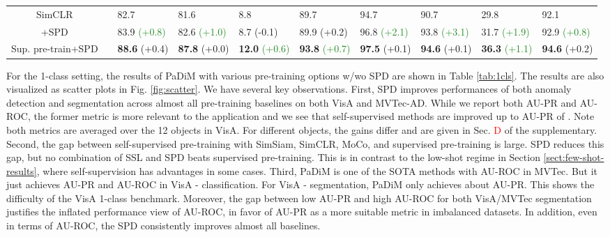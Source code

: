 \documentclass[runningheads]{llncs}
\newcommand{\cmark}{\ding{51}}\newcommand{\xmark}{\ding{55}}\usepackage[colorlinks]{hyperref}
\begin{document}
\begin{table*}[!t]
{\begin{tabular}{c|c|llll||llll}
    SimCLR               & \xmark & 82.7 & \multicolumn{1}{l|}{81.6}  & 8.8  & 89.7   & 94.7 & \multicolumn{1}{l|}{90.7}  & 29.8 & 92.1  \\
    +SPD                 & \xmark & 83.9 \textcolor{forestgreen}{(+0.8)} & \multicolumn{1}{l|}{82.6 \textcolor{forestgreen}{(+1.0)}}  & 8.7 (-0.1) & 89.9 (+0.2) & 96.8 \textcolor{forestgreen}{(+2.1)} & \multicolumn{1}{l|}{93.8 \textcolor{forestgreen}{(+3.1)}}  & 31.7 \textcolor{forestgreen}{(+1.9)} & 92.9 \textcolor{forestgreen}{(+0.8)} \\ \hline
    Sup. pre-train+SPD & \cmark & \textbf{88.6} (+0.4) & \multicolumn{1}{l|}{\textbf{87.8} (+0.0)}  & \textbf{12.0} \textcolor{forestgreen}{(+0.6)} & \textbf{93.8} \textcolor{forestgreen}{(+0.7)}  & \textbf{97.5} (+0.1) & \multicolumn{1}{l|}{\textbf{94.6} (+0.1)}  & \textbf{36.3} \textcolor{forestgreen}{(+1.1)} & \textbf{94.6} (+0.2) \\ \hline 
    \end{tabular}
	}
\end{table*}

For the 1-class setting, the results of PaDiM with various pre-training options w/wo SPD are shown in Table \ref{tab:1cls}. The results are also visualized as scatter plots in Fig. \ref{fig:scatter}. We have several key observations. First, SPD improves performances of both anomaly detection and segmentation across almost all pre-training baselines on both VisA and MVTec-AD. While we report both AU-PR and AU-ROC, the former metric is more relevant to the application and we see that self-supervised methods are improved up to AU-PR of . Note both metrics are averaged over the 12 objects in VisA. For different objects, the gains differ and are given in Sec. \textcolor{red}{D} of the supplementary. Second, the gap between self-supervised pre-training with SimSiam, SimCLR, MoCo, and supervised pre-training is large. SPD reduces this gap, but no combination of SSL and SPD beats supervised pre-training. This is in contrast to the low-shot regime in Section \ref{sect:few-shot-results}, where self-supervision has advantages in some cases. Third, PaDiM is one of the SOTA methods with  AU-ROC in MVTec. But it just achieves  AU-PR and AU-ROC in VisA - classification. For VisA - segmentation, PaDiM only achieves about  AU-PR. This shows the difficulty of the VisA 1-class benchmark. Moreover, the gap between low AU-PR and high AU-ROC for both VisA/MVTec segmentation justifies the inflated performance view of AU-ROC, in favor of AU-PR as a more suitable metric in imbalanced datasets. In addition, even in terms of AU-ROC, the SPD consistently improves almost all baselines. 
\end{document}
